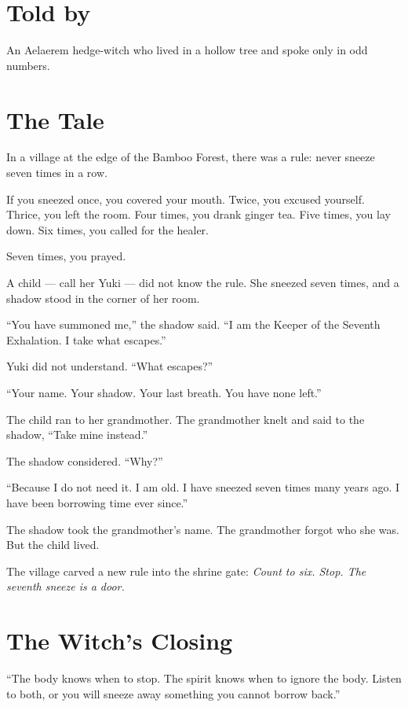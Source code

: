 \documentclass[10pt,twoside]{book}
\begin{document}
\section*{Told by}
An Aelaerem hedge-witch who lived in a hollow tree and spoke only in odd numbers.

\section*{The Tale}
In a village at the edge of the Bamboo Forest, there was a rule: never sneeze seven times in a row.

If you sneezed once, you covered your mouth. Twice, you excused yourself. Thrice, you left the room. Four times, you drank ginger tea. Five times, you lay down. Six times, you called for the healer.

Seven times, you prayed.

A child --- call her Yuki --- did not know the rule. She sneezed seven times, and a shadow stood in the corner of her room.

``You have summoned me,'' the shadow said. ``I am the Keeper of the Seventh Exhalation. I take what escapes.''

Yuki did not understand. ``What escapes?''

``Your name. Your shadow. Your last breath. You have none left.''

The child ran to her grandmother. The grandmother knelt and said to the shadow, ``Take mine instead.''

The shadow considered. ``Why?''

``Because I do not need it. I am old. I have sneezed seven times many years ago. I have been borrowing time ever since.''

The shadow took the grandmother's name. The grandmother forgot who she was. But the child lived.

The village carved a new rule into the shrine gate: \textit{Count to six. Stop. The seventh sneeze is a door.}

\section*{The Witch's Closing}
``The body knows when to stop. The spirit knows when to ignore the body. Listen to both, or you will sneeze away something you cannot borrow back.''
\end{document}
